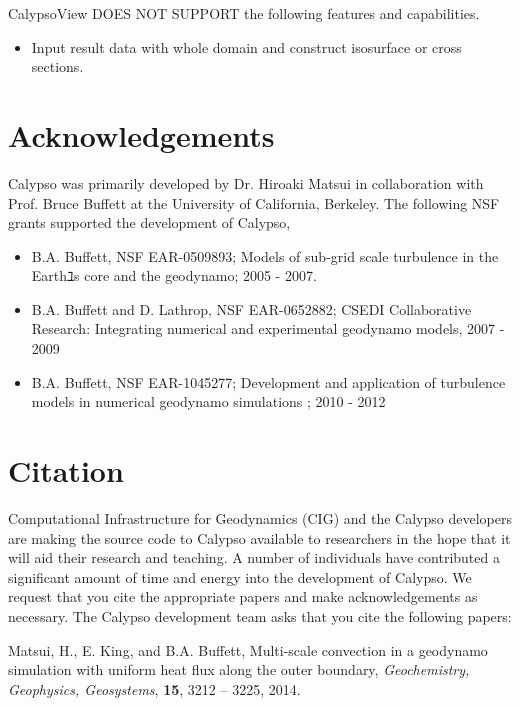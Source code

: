 CalypsoView DOES NOT SUPPORT the following features and capabilities.
%
\begin{itemize}
\item Input result data with whole domain and construct isosurface or cross sections.
\end{itemize}
%


\section{Acknowledgements}
\label{section:acknowledgements}
Calypso was primarily developed by Dr. Hiroaki Matsui in collaboration with Prof. Bruce Buffett at the University of California, Berkeley. The following NSF grants supported the development of Calypso, 
%
\begin{itemize}
\item B.A. Buffett, NSF EAR-0509893; Models of sub-grid scale turbulence in the Earthﾕs core and the geodynamo; 2005 - 2007.
\item B.A. Buffett and D. Lathrop,  NSF EAR-0652882; CSEDI Collaborative Research: Integrating numerical and experimental geodynamo models, 2007 - 2009
\item B.A. Buffett, NSF EAR-1045277; Development and application of turbulence models in numerical geodynamo simulations ;  2010 - 2012
\end{itemize}
%

\section{Citation}
\label{section:citation}

Computational Infrastructure for Geodynamics (CIG) and the Calypso developers are making the source code to Calypso available to researchers in the hope that it will aid their research and teaching. A number of individuals have contributed a significant amount of time and energy into the development of Calypso. We request that you cite the appropriate papers and make acknowledgements as necessary. The Calypso development team asks that you cite the following papers:

Matsui, H., E. King, and B.A. Buffett, Multi-scale convection in a geodynamo simulation with uniform heat flux along the outer boundary, {\it Geochemistry, Geophysics, Geosystems}, {\bf 15}, 3212 -- 3225, 2014.
